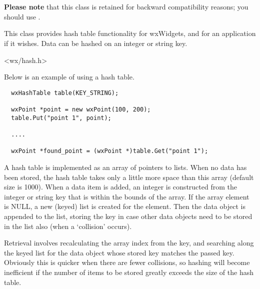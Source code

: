 \section{}\label{wxhashtable}

{\bf Please note} that this class is retained for backward compatibility
reasons; you should use .

This class provides hash table functionality for wxWidgets, and for an
application if it wishes.  Data can be hashed on an integer or string
key.




<wx/hash.h>


Below is an example of using a hash table.

\begin{verbatim}
  wxHashTable table(KEY_STRING);

  wxPoint *point = new wxPoint(100, 200);
  table.Put("point 1", point);

  ....

  wxPoint *found_point = (wxPoint *)table.Get("point 1");
\end{verbatim}

A hash table is implemented as an array of pointers to lists. When no
data has been stored, the hash table takes only a little more space than
this array (default size is 1000).  When a data item is added, an
integer is constructed from the integer or string key that is within the
bounds of the array. If the array element is NULL, a new (keyed) list is
created for the element. Then the data object is appended to the list,
storing the key in case other data objects need to be stored in the list
also (when a `collision' occurs).

Retrieval involves recalculating the array index from the key, and searching
along the keyed list for the data object whose stored key matches the passed
key. Obviously this is quicker when there are fewer collisions, so hashing
will become inefficient if the number of items to be stored greatly exceeds
the size of the hash table.




